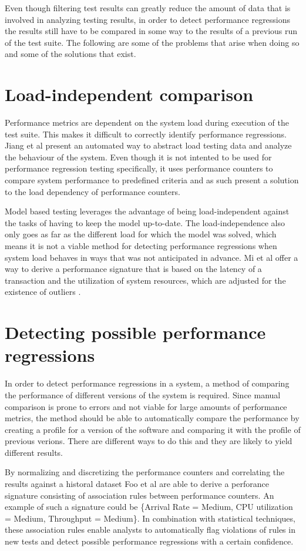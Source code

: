 Even though filtering test results can greatly reduce the amount of data that is involved in analyzing testing results, in order to detect performance regressions the results still have to be compared in some way to the results of a previous run of the test suite. The following are some of the problems that arise when doing so and some of the solutions that exist.

\section{Load-independent comparison}
Performance metrics are dependent on the system load during execution of the test suite. This makes it difficult to correctly identify performance regressions. Jiang et al present an automated way to abstract load testing data and analyze the behaviour of the system. \cite{jiang2010automated} Even though it is not intented to be used for performance regression testing specifically, it uses performance counters to compare system performance to predefined criteria and as such present a solution to the load dependency of performance counters.

Model based testing leverages the advantage of being load-independent against the tasks of having to keep the model up-to-date. The load-independence also only goes as far as the different load for which the model was solved, which means it is not a viable method for detecting performance regressions when system load behaves in ways that was not anticipated in advance. Mi et al offer a way to derive a performance signature that is based on the latency of a transaction and the utilization of system resources, which are adjusted for the existence of outliers \cite{mi2008analysis}.

\section{Detecting possible performance regressions}
In order to detect performance regressions in a system, a method of comparing the performance of different versions of the system is required. Since manual comparison is prone to errors and not viable for large amounts of performance metrics, the method should be able to automatically compare the performance by creating a profile for a version of the software and comparing it with the profile of previous verions. There are different ways to do this and they are likely to yield different results.

By normalizing and discretizing the performance counters and correlating the results against a historal dataset Foo et al are able to derive a perforance signature \cite{foo2010mining} consisting of association rules between performance counters. An example of such a signature could be \{Arrival Rate = Medium, CPU utilization = Medium, Throughput = Medium\}. In combination with statistical techniques, these association rules enable analysts to automatically flag violations of rules in new tests and detect possible performance regressions with a certain confidence.

